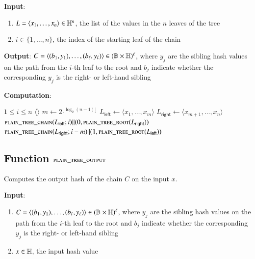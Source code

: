 \textbf{Input}:
\begin{enumerate}
	\item $L = \langle x_1, \ldots, x_n \rangle \in \mathbb{H}^n$, the list of the values in the $n$ leaves of the tree
	\item $i \in \{1, \ldots, n\}$, the index of the starting leaf of the chain
\end{enumerate}

\textbf{Output}:
$C = \langle (b_1, y_1), \ldots, (b_\ell, y_\ell) \rangle \in (\mathbb{B} \times \mathbb{H})^\ell$, where $y_j$ are the sibling hash values on the path from the $i$-th leaf to the root and $b_j$ indicate whether the corresponding $y_j$ is the right- or left-hand sibling

\textbf{Computation}:
\begin{algorithmic}
		\State \Assert $1 \le i \le n$
		 
			\State \Return $\langle \rangle$
		\Else
			\State $m \gets 2^{\lfloor \log_2(n-1) \rfloor}$ 
			\State $L_\mathsf{left} \gets \langle x_1, \ldots, x_m \rangle$
			\State $L_\mathsf{right} \gets \langle x_{m+1}, \ldots, x_n \rangle$
				\State \Return $\Call{plain\_tree\_chain}{L_\mathsf{left}; i} \| (0, \Call{plain\_tree\_root}{L_\mathsf{right}})$
			\Else
				\State \Return $\Call{plain\_tree\_chain}{L_\mathsf{right}; i-m} \| (1, \Call{plain\_tree\_root}{L_\mathsf{left}})$
			\EndIf
		\EndIf
	\EndFunction
\end{algorithmic}

\subsection{Function $\textsc{plain\_tree\_output}$}\label{sec:plain-tree-output}

Computes the output hash of the chain $C$ on the input $x$.

\textbf{Input}:
\begin{enumerate}
	\item $C = \langle (b_1, y_1), \ldots, (b_\ell, y_\ell) \rangle \in (\mathbb{B} \times \mathbb{H})^\ell$, where $y_j$ are the sibling hash values on the path from the $i$-th leaf to the root and $b_j$ indicate whether the corresponding $y_j$ is the right- or left-hand sibling
	\item $x \in \mathbb{H}$, the input hash value
\end{enumerate}

